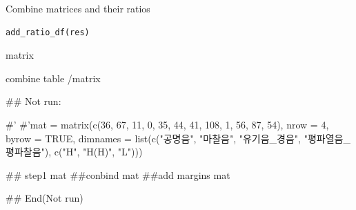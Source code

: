 \documentclass[a4paper]{book}
\begin{document}
%
\begin{Description}
Combine matrices and their ratios
\end{Description}
%
\begin{Usage}
\begin{verbatim}
add_ratio_df(res)
\end{verbatim}
\end{Usage}
%
\begin{Arguments}
\begin{ldescription}
\item[\code{res}] matrix
\end{ldescription}
\end{Arguments}
%
\begin{Value}
combine table /matrix
\end{Value}
%
\begin{Examples}
\begin{ExampleCode}

\#\# Not run: 

#' #'mat = matrix(c(36, 67, 11,
          0, 35, 44,
         41, 108, 1,
          56, 87, 54),
           nrow = 4, byrow = TRUE,
   dimnames = list(c("공명음", "마찰음",
     "유기음_경음", "평파열음_평파찰음"),  c("H", "H(H)", "L")))

## step1
  mat %
##conbind
 mat %
##add margins
 mat %

## End(Not run)


\end{ExampleCode}
\end{Examples}
\end{document}
